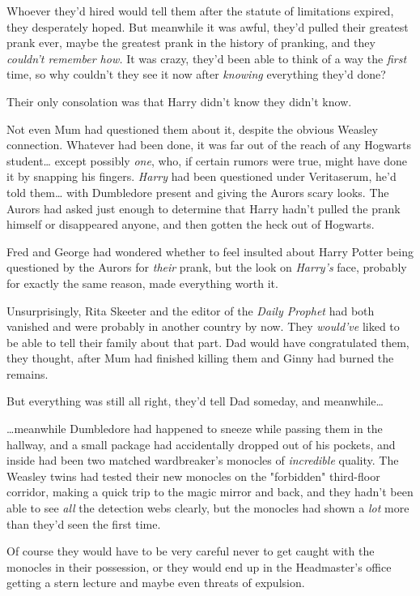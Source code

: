 Whoever they'd hired would tell them after the statute of limitations expired, 
they desperately hoped. But meanwhile it was awful, they'd pulled their 
greatest prank ever, maybe the greatest prank in the history of pranking, and 
they \emph{couldn't remember how.} It was crazy, they'd been able to think of a 
way the \emph{first} time, so why couldn't they see it now after \emph{knowing} 
everything they'd done?

Their only consolation was that Harry didn't know they didn't know.

Not even Mum had questioned them about it, despite the obvious Weasley 
connection. Whatever had been done, it was far out of the reach of any Hogwarts 
student{\ldots} except possibly \emph{one}, who, if certain rumors were true, 
might have done it by snapping his fingers. \emph{Harry} had been questioned 
under Veritaserum, he'd told them{\ldots} with Dumbledore present and giving 
the Aurors scary looks. The Aurors had asked just enough to determine that 
Harry hadn't pulled the prank himself or disappeared anyone, and then gotten 
the heck out of Hogwarts.

Fred and George had wondered whether to feel insulted about Harry Potter being 
questioned by the Aurors for \emph{their} prank, but the look on \emph{Harry's} 
face, probably for exactly the same reason, made everything worth it.

Unsurprisingly, Rita Skeeter and the editor of the \emph{Daily Prophet} had 
both vanished and were probably in another country by now. They \emph{would've} 
liked to be able to tell their family about that part. Dad would have 
congratulated them, they thought, after Mum had finished killing them and Ginny 
had burned the remains.

But everything was still all right, they'd tell Dad someday, and 
meanwhile{\ldots}

{\ldots}meanwhile Dumbledore had happened to sneeze while passing them in the 
hallway, and a small package had accidentally dropped out of his pockets, and 
inside had been two matched wardbreaker's monocles of \emph{incredible} 
quality. The Weasley twins had tested their new monocles on the "forbidden" 
third-floor corridor, making a quick trip to the magic mirror and back, and 
they hadn't been able to see \emph{all} the detection webs clearly, but the 
monocles had shown a \emph{lot} more than they'd seen the first time.

Of course they would have to be very careful never to get caught with the 
monocles in their possession, or they would end up in the Headmaster's office 
getting a stern lecture and maybe even threats of expulsion.

